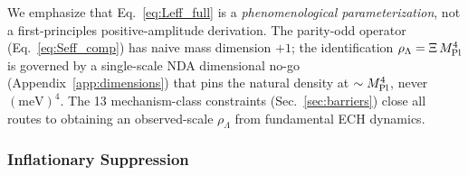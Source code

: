 \documentclass[aps,prd,twocolumn,superscriptaddress,showpacs,preprintnumbers,nofootinbib,longbibliography,floatfix]{revtex4-2}
\newcommand{\MPl}{M_{\rm Pl}}
\begin{document}
We emphasize that Eq.~\eqref{eq:Leff_full} is a \textit{phenomenological
parameterization}, not a first-principles positive-amplitude derivation. The
parity-odd operator (Eq.~\ref{eq:Seff_comp}) has naive mass dimension $+1$; the
identification $\rho_\Lambda = \Xi\,\MPl^4$ is governed by a single-scale NDA
dimensional no-go (Appendix~\ref{app:dimensions}) that pins the natural density
at $\sim\MPl^4$, never $(\text{meV})^4$. The 13 mechanism-class constraints
(Sec.~\ref{sec:barriers}) close all routes to obtaining an observed-scale
$\rho_\Lambda$ from fundamental ECH dynamics.

\subsubsection{Inflationary Suppression}\label{sec:dilution}
\end{document}

